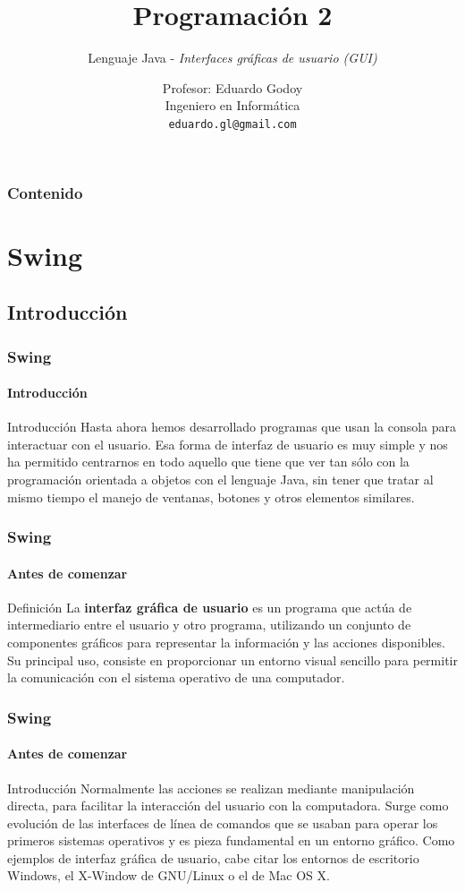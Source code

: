 \documentclass{beamer}
\title[\textbf{Programaci\'on 2}]{\textbf{Programaci\'on 2}}
\subtitle{Lenguaje Java - \emph{Interfaces gr\'aficas de usuario (GUI)}}
\author[Rodrigo Olivares]
{
	Profesor: Eduardo Godoy \\
	\vspace{0.5mm}
	Ingeniero en Inform\'atica \\
	\vspace{0.5mm}
	\texttt{\normalsize eduardo.gl@gmail.com}
}
\institute[Universidad de Valpara\'iso]
\begin{document}
	\begin{frame}
		\titlepage
	\end{frame}

	\begin{frame}
		\frametitle{Contenido}
		\tableofcontents%
	\end{frame}

    \section{Swing}

    \subsection{Introducci\'on}

	\begin{frame}
		\frametitle{Swing}
		\framesubtitle{Introducci\'on}

		\begin{block}{Introducci\'on}
            Hasta ahora hemos desarrollado programas que usan la consola para interactuar con el usuario. Esa forma de interfaz de usuario es muy simple y nos ha permitido centrarnos en todo aquello que tiene que ver tan s\'olo con la programaci\'on orientada a objetos con el lenguaje Java, sin tener que tratar al mismo tiempo el manejo de ventanas, botones y otros elementos similares.
        \end{block}
	\end{frame}

	\begin{frame}
		\frametitle{Swing}
		\framesubtitle{Antes de comenzar}

		\begin{alertblock}{Definici\'on}
            La \textbf{interfaz gr\'afica de usuario} es un programa que act\'ua de intermediario entre el usuario y otro programa, utilizando un conjunto de componentes gr\'aficos para representar la informaci\'on y las acciones disponibles. Su principal uso, consiste en proporcionar un entorno visual sencillo para permitir la comunicaci\'on con el sistema operativo de una computador.
        \end{alertblock}
	\end{frame}

	\begin{frame}
		\frametitle{Swing}
		\framesubtitle{Antes de comenzar}

		\begin{block}{Introducci\'on}
            Normalmente las acciones se realizan mediante manipulaci\'on directa, para facilitar la interacci\'on del usuario con la computadora. Surge como evoluci\'on de las interfaces de l\'inea de comandos que se usaban para operar los primeros sistemas operativos y es pieza fundamental en un entorno gr\'afico. Como ejemplos de interfaz gr\'afica de usuario, cabe citar los entornos de escritorio Windows, el X-Window de GNU/Linux o el de Mac OS X.
        \end{block}
	\end{frame}
\end{document}
